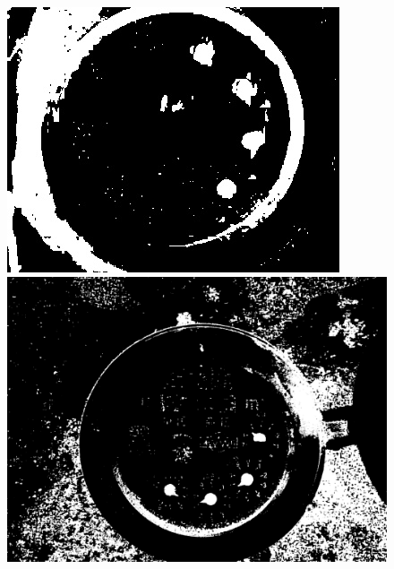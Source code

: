 \documentclass[a4paper]{ctexart}
\begin{document}
\begin{figure}[htbp]
	\centering
	\begin{minipage}[t]{0.25\textwidth}
		\centering
		\includegraphics[width=\textwidth]{figure/threshold/img1.jpg}
	\end{minipage}
	\begin{minipage}[t]{0.25\textwidth}
		\centering
		\includegraphics[width=\textwidth]{figure/threshold/img2.jpg}
	\end{minipage}\\
	\begin{minipage}[t]{0.25\textwidth}
		\centering

\end{minipage}
\end{figure}
\end{document}

